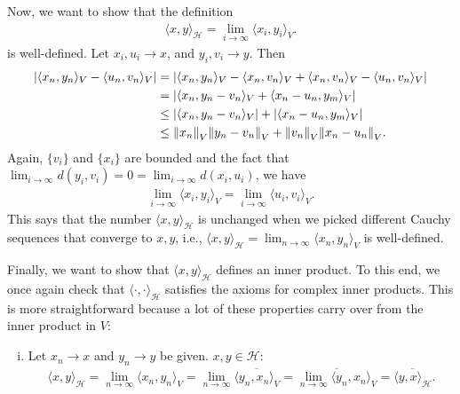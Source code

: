 \documentclass[11pt]{article}
\begin{document}
\begin{enumerate}[(a)]
\begin{itemize}
		
		Now, we want to show that the definition 
		\begin{align*}
		\langle x,y\rangle_\mathcal{H} = \lim_{i\to \infty}\langle x_i, y_i\rangle_V.
		\end{align*}
		is well-defined. Let $x_i, u_i \to x$, and $y_i, v_i \to y$. Then
		\begin{align*}
		\abs{\langle x_n,y_n\rangle_V - \langle u_n,v_n\rangle_V} &= \abs{\langle x_n,y_n \rangle_V - \langle x_n, v_n\rangle_V + \langle x_n,v_n \rangle_V - \langle u_n,v_n \rangle_V}\\
		&= \abs{\langle x_n, y_n -v_n \rangle_V  + \langle x_n-u_n, y_m \rangle_V }\\
		&\leq \abs{\langle x_n, y_n -v_n \rangle_V} + \abs{\langle x_n-u_n, y_m \rangle_V}\\
		&\leq \norm{x_n}_V\norm{y_n-v_n}_V + \norm{v_n}_V\norm{x_n - u_n}_V .
		\end{align*}
		Again, $\{v_i\}$ and $\{x_i\}$ are bounded and the fact that $\lim_{i\to\infty}d(y_i,v_i) = 0 = \lim_{i\to\infty}d(x_i,u_i)$, we have
		\begin{align*}
		\lim_{i\to \infty}\langle x_i,y_i\rangle_V = \lim_{i\to\infty}\langle u_i,v_i \rangle_V.
		\end{align*}
		This says that the number $\langle x,y\rangle_\mathcal{H}$ is unchanged when we picked different Cauchy sequences that converge to $x,y$, i.e., $\langle x,y\rangle_\mathcal{H} = \lim_{n\to\infty}\langle x_n,y_n\rangle_V$ is well-defined. 
		
		
		Finally, we want to show that $\langle x,y\rangle_{\mathcal{H}}$ defines an inner product. To this end, we once again check that $\langle \cdot,\cdot\rangle_\mathcal{H}$ satisfies the axioms for complex inner products. This is more straightforward because a lot of these properties carry over from the inner product in $V$:
		\begin{enumerate}[(i)]
			\item Let $x_n \to x$ and $y_n \to y$ be given. $x,y\in \mathcal{H}$:
 			\begin{align*}
			\langle x,y \rangle_\mathcal{H} = \lim_{n\to \infty}\langle x_n,y_n \rangle_V = \lim_{n\to \infty}\overline{\langle y_n,x_n \rangle_V} = \overline{\lim_{n\to \infty}{\langle y_n,x_n \rangle_V}} = \overline{\langle y,x\rangle_\mathcal{H}}.
			\end{align*}
			

\end{enumerate}
\end{itemize}
\end{enumerate}
\end{document}
